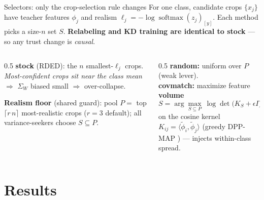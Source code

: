 \documentclass[aspectratio=169]{beamer}
\begin{document}
\begin{frame}{Selectors: only the crop-selection rule changes}
    \footnotesize
    For one class, candidate crops $\{x_j\}$ have teacher features $\phi_j$ and realism
    $\ell_j=-\log\operatorname{softmax}(z_j)_{[y]}$. Each method picks a size-$n$ set $S$.
    \textbf{Relabeling and KD training are identical to stock} --- so any trust change is \emph{causal}.

    \vspace{0.15cm}
    \begin{columns}[t]
        \begin{column}{0.5\textwidth}
            \scriptsize
            \textbf{stock} (RDED): the $n$ smallest-$\ell_j$ crops.\\
            \emph{Most-confident crops sit near the class mean} $\Rightarrow$ $\Sigma_W$ biased small
            $\Rightarrow$ over-collapse.

            \vspace{4pt}
            \textbf{Realism floor} (shared guard): pool $P=$ top $\lceil r\,n\rceil$ most-realistic crops
            ($r=3$ default); all variance-seekers choose $S\subseteq P$.
        \end{column}
        \begin{column}{0.5\textwidth}
            \scriptsize
            \textbf{random:} uniform over $P$ (weak lever).\\[2pt]
            \textbf{covmatch:} maximize feature \textbf{volume}
            \[ S=\arg\max_{S\subseteq P}\ \log\det\!\bigl(K_S+\epsilon I\bigr) \]
            on the cosine kernel $K_{ij}=\langle\tilde\phi_i,\tilde\phi_j\rangle$ (greedy DPP-MAP
            \cite{chen2018fast}) --- injects within-class spread.\\[2pt]
        \end{column}
    \end{columns}

\end{frame}

\section{Results}
\end{document}
